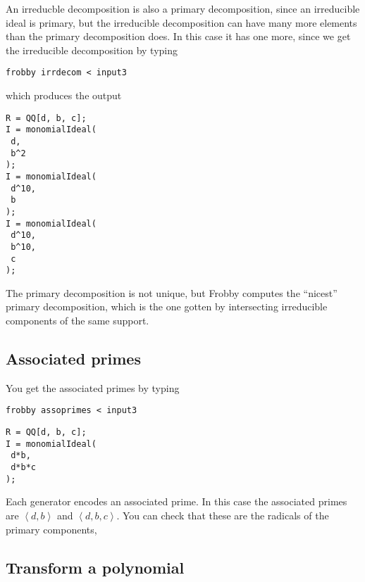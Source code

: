 \documentclass{amsart}
\theoremstyle{definition}
\newcommand{\ideal}[1]{\left<#1\right>}
\begin{document}
An irreducble decomposition is also a primary decomposition, since an
irreducible ideal is primary, but the irreducible decomposition can
have many more elements than the primary decomposition does. In this
case it has one more, since we get the irreducible decomposition by typing
\begin{verbatim}
frobby irrdecom < input3
\end{verbatim}
which produces the output
\begin{verbatim}
R = QQ[d, b, c];
I = monomialIdeal(
 d,
 b^2
);
I = monomialIdeal(
 d^10,
 b
);
I = monomialIdeal(
 d^10,
 b^10,
 c
);
\end{verbatim}

The primary decomposition is not unique, but Frobby computes the
``nicest'' primary decomposition, which is the one gotten by
intersecting irreducible components of the same support.

\subsection{Associated primes}

You get the associated primes by typing
\begin{verbatim}
frobby assoprimes < input3
\end{verbatim}

\begin{verbatim}
R = QQ[d, b, c];
I = monomialIdeal(
 d*b,
 d*b*c
);
\end{verbatim}
Each generator encodes an associated prime. In this case the
associated primes are $\ideal{d,b}$ and $\ideal{d,b,c}$. You can check
that these are the radicals of the primary components,

\subsection{Transform a polynomial}
\end{document}
